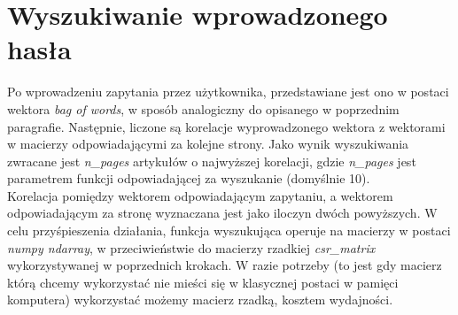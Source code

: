 \documentclass{article}
\begin{document}
    \section{Wyszukiwanie wprowadzonego hasła}
        Po wprowadzeniu zapytania przez użytkownika, przedstawiane jest ono w postaci wektora \textit{bag of words}, w sposób analogiczny do opisanego w poprzednim paragrafie. Następnie, liczone są korelacje wyprowadzonego wektora z wektorami w macierzy odpowiadającymi za kolejne strony. Jako wynik wyszukiwania zwracane jest \textit{n\_pages} artykułów o najwyższej korelacji, gdzie \textit{n\_pages} jest parametrem funkcji odpowiadającej za wyszukanie (domyślnie 10).\\
        
        Korelacja pomiędzy wektorem odpowiadającym zapytaniu, a wektorem odpowiadającym za stronę wyznaczana jest jako iloczyn dwóch powyższych. W celu przyśpieszenia działania, funkcja wyszukująca operuje na macierzy w postaci \textit{numpy ndarray}, w przeciwieństwie do macierzy rzadkiej \textit{csr\_matrix} wykorzystywanej w poprzednich krokach. W razie potrzeby (to jest gdy macierz którą chcemy wykorzystać nie mieści się w klasycznej postaci w pamięci komputera) wykorzystać możemy macierz rzadką, kosztem wydajności. 
        
\end{document}
